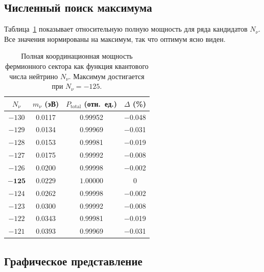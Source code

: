 \documentclass[11pt,a4paper]{article}
\begin{document}
	\subsection{Численный поиск максимума}
	
	Таблица~\ref{tab:power} показывает относительную полную мощность для ряда кандидатов \(N_{\nu}\).  Все значения нормированы на максимум, так что оптимум ясно виден.
	
	\begin{table}[htbp]
		\centering
		\caption{Полная координационная мощность фермионного сектора как функция квантового числа нейтрино \(N_{\nu}\).  Максимум достигается при \(N_{\nu}=-125\).}
		\label{tab:power}
		\small
		\begin{tabular}{c c c c}
			\toprule
			\(N_{\nu}\) & \(m_{\nu}\) (эВ) & \(P_{\mathrm{total}}\) (отн.\ ед.) & \(\Delta\) (\%) \\
			\midrule
			\(-130\) & 0.0117 & 0.99952 & $-$0.048 \\
			\(-129\) & 0.0134 & 0.99969 & $-$0.031 \\
			\(-128\) & 0.0153 & 0.99981 & $-$0.019 \\
			\(-127\) & 0.0175 & 0.99992 & $-$0.008 \\
			\(-126\) & 0.0200 & 0.99998 & $-$0.002 \\
			$\mathbf{-125}$ & $\mathbf{0.0229}$ & $\mathbf{1.00000}$ & 0 \\
			\(-124\) & 0.0262 & 0.99998 & $-$0.002 \\
			\(-123\) & 0.0300 & 0.99992 & $-$0.008 \\
			\(-122\) & 0.0343 & 0.99981 & $-$0.019 \\
			\(-121\) & 0.0393 & 0.99969 & $-$0.031 \\
			\bottomrule
		\end{tabular}
	\end{table}
	
	\subsection{Графическое представление}
	
\end{document}
